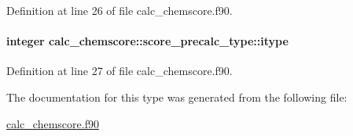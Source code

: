 Definition at line 26 of file calc\-\_\-chemscore.\-f90.

\hypertarget{structcalc__chemscore_1_1score__precalc__type_acf3304a666672e5e7ba6470e3947c038}{
\paragraph[{itype}]{\setlength{\rightskip}{0pt plus 5cm}integer calc\-\_\-chemscore\-::score\-\_\-precalc\-\_\-type\-::itype}}\label{structcalc__chemscore_1_1score__precalc__type_acf3304a666672e5e7ba6470e3947c038}


Definition at line 27 of file calc\-\_\-chemscore.\-f90.



The documentation for this type was generated from the following file\-:\begin{DoxyCompactItemize}
\item 
\hyperlink{calc__chemscore_8f90}{calc\-\_\-chemscore.\-f90}\end{DoxyCompactItemize}
